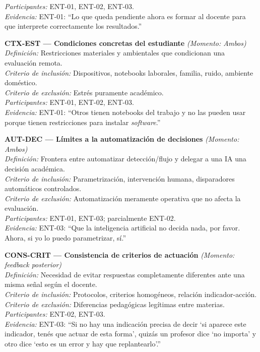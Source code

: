 \begin{center}
\begin{infobox}
\textit{Participantes:} ENT-01, ENT-02, ENT-03.\\
\textit{Evidencia:} ENT-01: ``Lo que queda pendiente ahora es formar al docente para que interprete correctamente los resultados.''
\end{infobox}
\vspace{2pt}
\begin{infobox}
\textbf{\textcolor{accent}{CTX-EST --- Condiciones concretas del estudiante}} \textit{(Momento: Ambos)}\\
\textit{Definición:} Restricciones materiales y ambientales que condicionan una evaluación remota.\\
\textit{Criterio de inclusión:} Dispositivos, notebooks laborales, familia, ruido, ambiente doméstico.\\
\textit{Criterio de exclusión:} Estrés puramente académico.\\
\textit{Participantes:} ENT-01, ENT-02, ENT-03.\\
\textit{Evidencia:} ENT-01: ``Otros tienen notebooks del trabajo y no las pueden usar porque tienen restricciones para instalar \textit{software}.''
\end{infobox}
\vspace{2pt}
\begin{infobox}
\textbf{\textcolor{accent}{AUT-DEC --- Límites a la automatización de decisiones}} \textit{(Momento: Ambos)}\\
\textit{Definición:} Frontera entre automatizar detección/flujo y delegar a una IA una decisión académica.\\
\textit{Criterio de inclusión:} Parametrización, intervención humana, disparadores automáticos controlados.\\
\textit{Criterio de exclusión:} Automatización meramente operativa que no afecta la evaluación.\\
\textit{Participantes:} ENT-01, ENT-03; parcialmente ENT-02.\\
\textit{Evidencia:} ENT-03: ``Que la inteligencia artificial no decida nada, por favor. Ahora, si yo lo puedo parametrizar, sí.''
\end{infobox}
\vspace{2pt}
\begin{infobox}
\textbf{\textcolor{accent}{CONS-CRIT --- Consistencia de criterios de actuación}} \textit{(Momento: \textit{feedback} posterior)}\\
\textit{Definición:} Necesidad de evitar respuestas completamente diferentes ante una misma señal según el docente.\\
\textit{Criterio de inclusión:} Protocolos, criterios homogéneos, relación indicador-acción.\\
\textit{Criterio de exclusión:} Diferencias pedagógicas legítimas entre materias.\\
\textit{Participantes:} ENT-02, ENT-03.\\
\textit{Evidencia:} ENT-03: ``Si no hay una indicación precisa de decir `si aparece este indicador, tenés que actuar de esta forma', quizás un profesor dice `no importa' y otro dice `esto es un error y hay que replantearlo'.''
\end{infobox}
\vspace{2pt}
\end{center}
